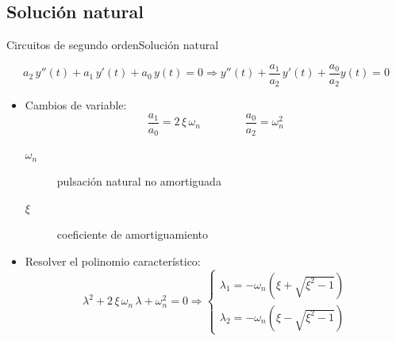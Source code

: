 \documentclass[aspectratio=169, xcolor={usenames,svgnames,dvipsnames}]{beamer}
\begin{document}
\subsection{Solución natural}

\begin{frame}{Circuitos de segundo orden}{Solución natural}
    
	\begin{equation*}
	    a_2\,y''(t)+a_1\,y'(t)+a_0\,y(t)=0\Rightarrow \boxed{y''(t)+\dfrac{a_1}{a_2}\,y'(t)+\dfrac{a_0}{a_2}y(t)=0}
	\end{equation*}
	\begin{itemize}
	    \item Cambios de variable:
	    \begin{equation*}
	    {\dfrac{a_1}{a_0}=2\,\xi\,\omega_n}\qquad \qquad {\dfrac{a_0}{a_2}=\omega_n^2}
	\end{equation*}
	\begin{description}
	\item [$\omega_n$] pulsación natural no amortiguada
	\item [$\xi$] coeficiente de amortiguamiento
	\end{description}
	\item Resolver el polinomio característico:
	\begin{equation*}
	    \lambda^2+2\,\xi\,\omega_n\,\lambda + \omega_n^2=0\Rightarrow
	    \begin{cases}
	      \lambda_1=-\omega_n\left(\xi+\sqrt{\xi^2-1} \right)\\ \lambda_2=-\omega_n\left(\xi-\sqrt{\xi^2-1} \right)
	    \end{cases}
	\end{equation*}
	\end{itemize}
\end{frame}
\end{document}
